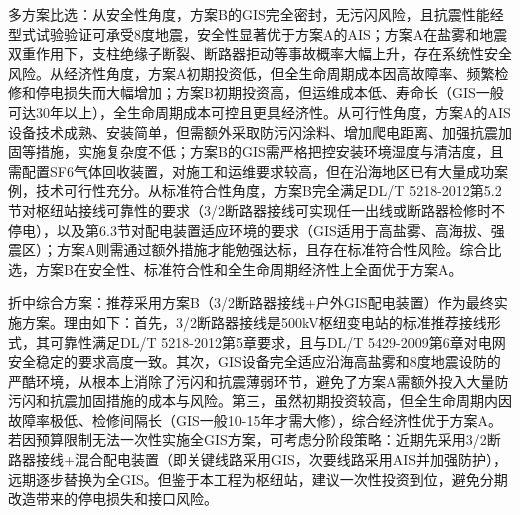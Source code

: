 \documentclass[11pt,a4paper]{ctexart}
\begin{document}
\begin{description}[leftmargin=1.5em,style=nextline,font=\normalfont]
多方案比选：从安全性角度，方案B的GIS完全密封，无污闪风险，且抗震性能经型式试验验证可承受8度地震，安全性显著优于方案A的AIS；方案A在盐雾和地震双重作用下，支柱绝缘子断裂、断路器拒动等事故概率大幅上升，存在系统性安全风险。从经济性角度，方案A初期投资低，但全生命周期成本因高故障率、频繁检修和停电损失而大幅增加；方案B初期投资高，但运维成本低、寿命长（GIS一般可达30年以上），全生命周期成本可控且更具经济性。从可行性角度，方案A的AIS设备技术成熟、安装简单，但需额外采取防污闪涂料、增加爬电距离、加强抗震加固等措施，实施复杂度不低；方案B的GIS需严格把控安装环境湿度与清洁度，且需配置SF6气体回收装置，对施工和运维要求较高，但在沿海地区已有大量成功案例，技术可行性充分。从标准符合性角度，方案B完全满足DL/T 5218-2012第5.2节对枢纽站接线可靠性的要求（3/2断路器接线可实现任一出线或断路器检修时不停电），以及第6.3节对配电装置适应环境的要求（GIS适用于高盐雾、高海拔、强震区）；方案A则需通过额外措施才能勉强达标，且存在标准符合性风险。综合比选，方案B在安全性、标准符合性和全生命周期经济性上全面优于方案A。

折中综合方案：推荐采用方案B（3/2断路器接线+户外GIS配电装置）作为最终实施方案。理由如下：首先，3/2断路器接线是500kV枢纽变电站的标准推荐接线形式，其可靠性满足DL/T 5218-2012第5章要求，且与DL/T 5429-2009第6章对电网安全稳定的要求高度一致。其次，GIS设备完全适应沿海高盐雾和8度地震设防的严酷环境，从根本上消除了污闪和抗震薄弱环节，避免了方案A需额外投入大量防污闪和抗震加固措施的成本与风险。第三，虽然初期投资较高，但全生命周期内因故障率极低、检修间隔长（GIS一般10-15年才需大修），综合经济性优于方案A。若因预算限制无法一次性实施全GIS方案，可考虑分阶段策略：近期先采用3/2断路器接线+混合配电装置（即关键线路采用GIS，次要线路采用AIS并加强防护），远期逐步替换为全GIS。但鉴于本工程为枢纽站，建议一次性投资到位，避免分期改造带来的停电损失和接口风险。


\end{description}
\end{document}
